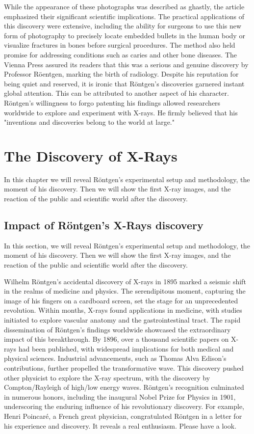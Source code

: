 \documentclass[a4paper,12pt]{report}
\begin{document}
While the appearance of these photographs was described as ghastly, the article emphasized their
significant scientific implications. The practical applications of this discovery were extensive,
including the ability for surgeons to use this new form of photography to precisely locate
embedded bullets in the human body or visualize fractures in bones before surgical procedures.
The method also held promise for addressing conditions such as caries and other bone diseases.
The Vienna Press assured its readers that this was a serious and genuine discovery by Professor
Röentgen, marking the birth of radiology.
Despite his reputation for being quiet and reserved, it is ironic that Röntgen's discoveries
garnered instant global attention. This can be attributed to another aspect of his character.
Röntgen's willingness to forgo patenting his findings allowed researchers worldwide to explore
and experiment with X-rays. He firmly believed that his "inventions and discoveries belong to the
world at large."

\chapter{The Discovery of X-Rays}
In this chapter we will reveal Röntgen's experimental setup and methodology, the moment of his discovery. Then we will show the first X-ray images, and the reaction of the public and scientific world after the discovery.

\section{Impact of Röntgen's X-Rays discovery}

In this section, we will reveal Röntgen's experimental setup and methodology, the
moment of his discovery. Then we will show the first X-ray images, and the reaction of
the public and scientific world after the discovery.

Wilhelm Röntgen's accidental discovery of X-rays in 1895 marked a seismic shift in the
realms of medicine and physics. The serendipitous moment, capturing the image of his fingers
on a cardboard screen, set the stage for an unprecedented revolution. Within months, X-rays
found applications in medicine, with studies initiated to explore vascular anatomy and the
gastrointestinal tract. The rapid dissemination of Röntgen's findings worldwide showcased the
extraordinary impact of this breakthrough. By 1896, over a thousand scientific papers on X-
rays had been published, with widespread implications for both medical and physical
sciences. Industrial advancements, such as Thomas Alva Edison's contributions, further
propelled the transformative wave. This discovery pushed other physicist to explore the X-ray
spectrum, with the discovery by Compton/Rayleigh of high/low energy waves. Röntgen's
recognition culminated in numerous honors, including the inaugural Nobel Prize for Physics
in 1901, underscoring the enduring influence of his revolutionary discovery.
\newpage
For example, Henri Poincaré, a French great physician, congratulated Röntgen in a letter  for his experience and discovery. It reveals a real enthusiasm. Please have a look.
\end{document}
